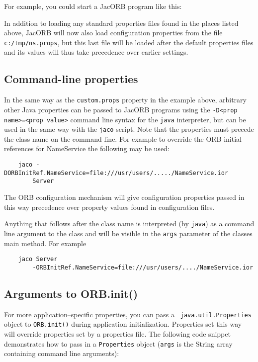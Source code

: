 For example, you could start a JacORB program like this:


In addition to loading any standard properties files found in the
places listed above, JacORB will now also load configuration
properties from the file {\tt c:/tmp/ns.props}, but this last file
will be loaded after the default properties files and its values will
thus take precedence over earlier settings.

\subsection{Command-line properties}

In the same way as the {\tt custom.props} property in the example
above, arbitrary other Java properties can be passed to JacORB
programs using the {\tt -D<prop name>=<prop value>} command line
syntax for the {\tt java} interpreter, but can be used in the same way
with the {\tt jaco} script. Note that the properties must precede
the class name on the command line. For example to override the
ORB initial references for NameService the following may be used:

\small{
\begin{verbatim}
    jaco -DORBInitRef.NameService=file:///usr/users/...../NameService.ior
        Server
\end{verbatim}
}

The ORB configuration mechanism will give configuration properties
passed in this way precedence over property values found in
configuration files.

Anything that follows after the class name is interpreted (by {\tt java}) as a
command line argument to the class and will be visible in the {\tt args}
parameter of the classes main method. For example

\small{
\begin{verbatim}
    jaco Server
        -ORBInitRef.NameService=file:///usr/users/..../NameService.ior
\end{verbatim}
}

\subsection{Arguments to ORB.init()}

For more application--specific properties, you can pass a {\tt
 java.util.Properties} object to {\tt ORB.init()} during application
initialization. Properties set this way will override properties set
by a properties file. The following code snippet demonstrates how to
pass in a {\tt Properties} object ({\tt args} is the String array
containing command line arguments):

